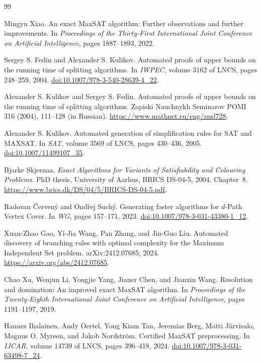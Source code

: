 \documentclass[10pt,twoside]{article}
\theoremstyle{definition}
\theoremstyle{remark}
\begin{document}
\begin{thebibliography}{99}
\selectfont

Mingyu Xiao.
\newblock An exact MaxSAT algorithm: Further observations and further
improvements.
\newblock In \emph{Proceedings of the Thirty-First International Joint
Conference on Artificial Intelligence}, pages 1887--1893, 2022.

Sergey S. Fedin and Alexander S. Kulikov.
\newblock Automated proofs of upper bounds on the running time of splitting algorithms.
\newblock In \emph{IWPEC}, volume 3162 of LNCS, pages 248--259, 2004.
\newblock \href{https://doi.org/10.1007/978-3-540-28639-4_22}{doi:10.1007/978-3-540-28639-4\_22}.

Alexander S. Kulikov and Sergey S. Fedin.
\newblock Automated proofs of upper bounds on the running time of splitting algorithms.
\newblock Zapiski Nauchnykh Seminarov POMI 316 (2004), 111--128 (in Russian).
\newblock \url{https://www.mathnet.ru/eng/znsl728}.

Alexander S. Kulikov.
\newblock Automated generation of simplification rules for SAT and MAXSAT.
\newblock In \emph{SAT}, volume 3569 of LNCS, pages 430--436, 2005.
\newblock \href{https://doi.org/10.1007/11499107_35}{doi:10.1007/11499107\_35}.

Bjarke Skjernaa.
\newblock \emph{Exact Algorithms for Variants of Satisfiability and Colouring Problems}.
\newblock PhD thesis, University of Aarhus, BRICS DS-04-5, 2004. Chapter~8.
\newblock \url{https://www.brics.dk/DS/04/5/BRICS-DS-04-5.pdf}.

Radovan \v{C}erven\'y and Ond\v{r}ej Such\'y.
\newblock Generating faster algorithms for $d$-Path Vertex Cover.
\newblock In \emph{WG}, pages 157--171, 2023.
\newblock \href{https://doi.org/10.1007/978-3-031-43380-1_12}{doi:10.1007/978-3-031-43380-1\_12}.

Xuan-Zhao Gao, Yi-Jia Wang, Pan Zhang, and Jin-Guo Liu.
\newblock Automated discovery of branching rules with optimal complexity for
  the Maximum Independent Set problem.
\newblock arXiv:2412.07685, 2024.
\newblock \url{https://arxiv.org/abs/2412.07685}.

Chao Xu, Wenjun Li, Yongjie Yang, Jianer Chen, and Jianxin Wang.
\newblock Resolution and domination: An improved exact MaxSAT algorithm.
\newblock In \emph{Proceedings of the Twenty-Eighth International Joint
Conference on Artificial Intelligence}, pages 1191--1197, 2019.

Hannes Ihalainen, Andy Oertel, Yong Kiam Tan, Jeremias Berg,
Matti J\"arvisalo, Magnus O. Myreen, and Jakob Nordstr\"om.
\newblock Certified MaxSAT preprocessing.
\newblock In \emph{IJCAR}, volume 14739 of LNCS, pages 396--418, 2024.
\newblock \href{https://doi.org/10.1007/978-3-031-63498-7_24}{doi:10.1007/978-3-031-63498-7\_24}.

\end{thebibliography}
\end{document}
